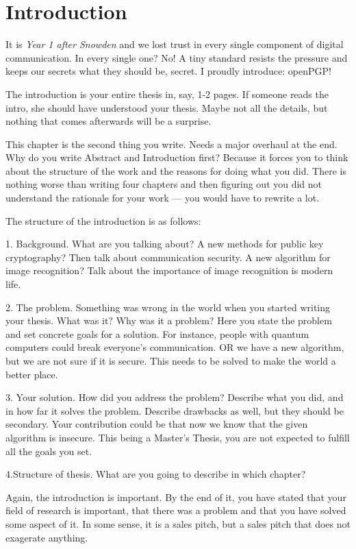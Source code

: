 \chapter{Introduction}


It is \textit{Year 1 after Snowden} and we lost trust in every single component of digital communication. In every single one? No! A tiny standard resists the pressure and keeps our secrets what they should be, secret. I proudly introduce: openPGP!


The introduction is your entire thesis in, say, 1-2 pages. If someone reads
the intro, she should have understood your thesis. Maybe not all the
details, but nothing that comes afterwards will be a surprise.

This chapter is the second thing you write. Needs a major overhaul
at the end. Why do you write Abstract and Introduction first?
Because it forces you to think about the structure of the work and
the reasons for doing what you did. There is nothing worse than
writing four chapters and then figuring out you did not understand
the rationale for your work --- you would have to rewrite a lot.

The structure of the introduction is as follows:

1. Background. What are you talking about? A new methods for public
key cryptography? Then talk about communication security. A new
algorithm for image recognition? Talk about the importance of image
recognition is modern life.

2. The problem. Something was wrong in the world when you started
writing your thesis. What was it? Why was it a problem? Here you
state the problem and set concrete goals for a solution. For
instance, people with quantum computers could break everyone's
communication. OR we have a new algorithm, but we are not sure if
it is secure. This needs to be solved to make the world a better
place.

3. Your solution. How did you address the problem? Describe what
you did, and in how far it solves the problem. Describe drawbacks
as well, but they should be secondary. Your contribution could be
that now we know that the given algorithm is insecure. This being
a Master's Thesis, you are not expected to fulfill all the goals you
set.

4.Structure of thesis. What are you going to describe in which
chapter?

Again, the introduction is important. By the end of it, you have stated
that your field of research is important, that there was a problem and
that you have solved some aspect of it. In some sense, it is a sales
pitch,
but a sales pitch that does not exagerate anything.

